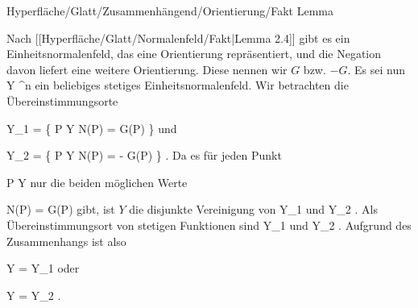 {Hyperfläche/Glatt/Zusammenhängend/Orientierung/Fakt}
{Lemma}
{}
{

\faktzusatz {}
\faktzusatz {}

}
{

Nach
[[Hyperfläche/Glatt/Normalenfeld/Fakt|Lemma 2.4]]
gibt es ein Einheitsnormalenfeld, das eine Orientierung repräsentiert, und die Negation davon liefert eine weitere Orientierung. Diese nennen wir $G$ bzw. $-G$. Es sei nun
 { Y } { \R^n
} {}
ein beliebiges stetiges Einheitsnormalenfeld. Wir betrachten die Übereinstimmungsorte

\mavergleichskettedisp
{\vergleichskette
{ Y_1
}
{ =} { \left\{ P \in Y  \mid   N(P) = G(P)         \right\}
}
{ } {
}
{ } {
}
{ } {
}
}
{}{}{}
und

\mavergleichskettedisp
{\vergleichskette
{ Y_2
}
{ =} { \left\{ P \in Y  \mid   N(P) = - G(P)         \right\}
}
{ } {
}
{ } {
}
{ } {
}
}
{}{}{.}
Da es für jeden Punkt

\mavergleichskette
{\vergleichskette
{ P
}
{ \in }{ Y
}
{  }{
}
{    }{
}
{   }{
}
}
{}{}{}
nur die beiden möglichen Werte

\mavergleichskettedisp
{\vergleichskette
{ N(P)
}
{ =} { \pm G(P)
}
{ } {
}
{ } {
}
{ } {
}
}
{}{}{}
gibt, ist $Y$ die disjunkte Vereinigung von
\mathkor {} {Y_1} {und} {Y_2} {.}
Als Übereinstimmungsort von stetigen Funktionen sind
\mathkor {} {Y_1} {und} {Y_2} {}
 {} {.}
Aufgrund des Zusammenhangs ist also

\mavergleichskette
{\vergleichskette
{ Y
}
{ = }{ Y_1
}
{  }{
}
{    }{
}
{   }{
}
}
{}{}{}
oder

\mavergleichskette
{\vergleichskette
{ Y
}
{ = }{ Y_2
}
{  }{
}
{    }{
}
{   }{
}
}
{}{}{.}

}


